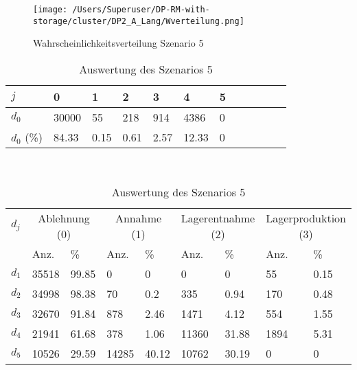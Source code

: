 \begin{figure}[h!]
  \begin{center}
    \texttt{[image: /Users/Superuser/DP-RM-with-storage/cluster/DP2\_A\_Lang/Wverteilung.png]}
    \caption{Wahrscheinlichkeitsverteilung Szenario 5}  \label{SB5}
  \end{center}
\end{figure}

\begin{table}[h!]
\renewcommand{\arraystretch}{1.5}
  \begin{center}
    \caption{Auswertung des Szenarios 5}  \label{AS5}
    \vspace*{3mm}
    \begin{tabular}{l l l l l l l l l l l l }  \hline 
         $j$ & 0 & 1  & 2 & 3 & 4  & 5   \\  \hline
$d_{0}$ &  30000 &  55 &  218 &  914 &  4386 &  0 \\
$d_{0}$ (\%) &  84.33 &  0.15 &  0.61 &  2.57 &  12.33 &  0 \\\hline
    \end{tabular} \\[3mm]
        \begin{tabular}{ l l l l l l l l l}   \hline    %
    $d_j$ & \multicolumn{2}{c}{Ablehnung (0)} & \multicolumn{2}{c}{Annahme (1)}  & \multicolumn{2}{c}{Lagerentnahme (2)} & \multicolumn{2}{c}{Lagerproduktion (3)}\\
    & Anz. & \% & Anz. & \% & Anz. & \% & Anz. & \% \\ \hline 
$d_1$ &  35518 &  99.85 &    0 &    0 &    0 &    0 &    55 &  0.15 \\
$d_2$ &  34998 &  98.38 &     70 &    0.2 &    335 &   0.94 &   170 &  0.48 \\
$d_3$ &  32670 &  91.84 &    878 &   2.46 &   1471 &   4.12 &   554 &  1.55 \\
$d_4$ &  21941 &  61.68 &    378 &   1.06 &  11360 &  31.88 &  1894 &  5.31 \\
$d_5$ &  10526 &  29.59 &  14285 &  40.12 &  10762 &  30.19 &   0 &   0 \\
          \hline
   \end{tabular} \\[3mm]
     \end{center}
\end{table}

